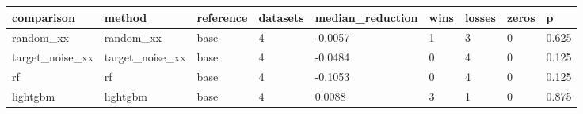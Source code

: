 \begin{tabular}{lllllllll}
\toprule
comparison & method & reference & datasets & median\_reduction & wins & losses & zeros & p \\
\midrule
random\_xx & random\_xx & base & 4 & -0.0057 & 1 & 3 & 0 & 0.625 \\
target\_noise\_xx & target\_noise\_xx & base & 4 & -0.0484 & 0 & 4 & 0 & 0.125 \\
rf & rf & base & 4 & -0.1053 & 0 & 4 & 0 & 0.125 \\
lightgbm & lightgbm & base & 4 & 0.0088 & 3 & 1 & 0 & 0.875 \\
\bottomrule
\end{tabular}
